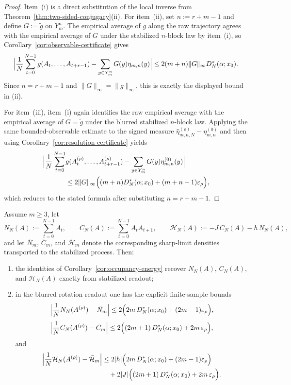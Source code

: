 \begin{proof}
Item~(i) is a direct substitution of the local inverse from Theorem~\ref{thm:two-sided-conjugacy}(ii). For item~(ii), set $n:=r+m-1$ and define $G:=\widetilde g$ on $Y_m^n$. The empirical average of $g$ along the raw trajectory agrees with the empirical average of $G$ under the stabilized $n$-block law by item~(i), so Corollary~\ref{cor:observable-certificate} gives
\[
\Bigl|
\frac1N\sum_{t=0}^{N-1} g(A_t,\dots,A_{t+r-1})
-
\sum_{y\in Y_m^n}G(y)\eta_{m,n}(y)
\Bigr|
\le
2(m+n)\|G\|_\infty D_N^*(\alpha;x_0).
\]
Since $n=r+m-1$ and $\|G\|_\infty=\|g\|_\infty$, this is exactly the displayed bound in (ii).

For item~(iii), item~(i) again identifies the raw empirical average with the empirical average of $G=\widetilde g$ under the blurred stabilized $n$-block law. Applying the same bounded-observable estimate to the signed measure $\hat{\eta}_{m,n,N}^{(\rho)}-\eta_{m,n}^{(0)}$ and then using Corollary~\ref{cor:resolution-certificate} yields
\begin{equation*}
\begin{aligned}
\Bigl|
\frac1N\sum_{t=0}^{N-1} &g(A_t^{(\rho)},\dots,A_{t+r-1}^{(\rho)})
-
\sum_{y\in Y_m^n}G(y)\eta_{m,n}^{(0)}(y)
\Bigr|
\\
&\le
2\|G\|_\infty\Bigl((m+n)D_N^*(\alpha;x_0)+(m+n-1)\varepsilon_\rho\Bigr),
\end{aligned}
\end{equation*}
which reduces to the stated formula after substituting $n=r+m-1$.
\end{proof}

\begin{corollary}\label{cor:prototype-hamiltonians}
Assume $m\ge 3$, let
\[
N_N(A):=\sum_{t=0}^{N-1}A_t,
\qquad
C_N(A):=\sum_{t=0}^{N-1}A_tA_{t+1},
\qquad
\mathcal H_N(A):=-J\,C_N(A)-h\,N_N(A),
\]
and let $\bar N_m$, $\bar C_m$, and $\bar{\mathcal H}_m$ denote the corresponding sharp-limit densities transported to the stabilized process. Then:
\begin{enumerate}[label=(\roman*),leftmargin=*,itemsep=2pt]
  \item the identities of Corollary~\ref{cor:occupancy-energy} recover $N_N(A)$, $C_N(A)$, and $\mathcal H_N(A)$ exactly from stabilized readout;
  \item in the blurred rotation readout one has the explicit finite-sample bounds
  \[
  \Bigl|\frac1N N_N(A^{(\rho)})-\bar N_m\Bigr|
  \le
  2\Bigl(2m\,D_N^*(\alpha;x_0)+(2m-1)\varepsilon_\rho\Bigr),
  \]
  \[
  \Bigl|\frac1N C_N(A^{(\rho)})-\bar C_m\Bigr|
  \le
  2\Bigl((2m+1)\,D_N^*(\alpha;x_0)+2m\,\varepsilon_\rho\Bigr),
  \]
  and
  \begin{equation*}
  \begin{aligned}
  \Bigl|\frac1N\mathcal H_N(A^{(\rho)})-\bar{\mathcal H}_m\Bigr|
  &\le
  2|h|\Bigl(2m\,D_N^*(\alpha;x_0)+(2m-1)\varepsilon_\rho\Bigr)
  \\
  &\quad+
  2|J|\Bigl((2m+1)\,D_N^*(\alpha;x_0)+2m\,\varepsilon_\rho\Bigr).
  \end{aligned}
  \end{equation*}
\end{enumerate}
\end{corollary}

